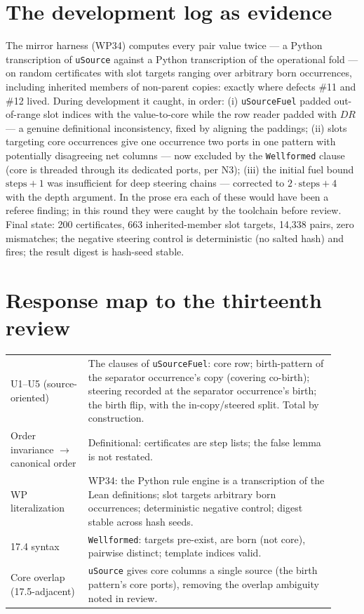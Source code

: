 \documentclass[11pt]{article}
\newcommand{\code}[1]{\texttt{#1}}
\begin{document}
\section{The development log as evidence}

The mirror harness (WP34) computes every pair value twice --- a Python
transcription of \code{uSource} against a Python transcription of the
operational fold --- on random certificates with slot targets ranging
over arbitrary born occurrences, including inherited members of
non-parent copies: exactly where defects \#11 and \#12 lived.  During
development it caught, in order: (i) \code{uSourceFuel} padded
out-of-range slot indices with the value-to-core while the row reader
padded with $DR$ --- a genuine definitional inconsistency, fixed by
aligning the paddings; (ii) slots targeting core occurrences give one
occurrence two ports in one pattern with potentially disagreeing net
columns --- now excluded by the \code{Wellformed} clause (core is
threaded through its dedicated ports, per N3); (iii) the initial fuel
bound $\mathrm{steps}+1$ was insufficient for deep steering chains ---
corrected to $2\cdot\mathrm{steps}+4$ with the depth argument.  In the
prose era each of these would have been a referee finding; in this
round they were caught by the toolchain before review.  Final state:
200 certificates, 663 inherited-member slot targets, 14{,}338 pairs,
zero mismatches; the negative steering control is deterministic (no
salted hash) and fires; the result digest is hash-seed stable.

\section{Response map to the thirteenth review}

\begin{center}
\begin{tabular}{p{0.22\linewidth}p{0.70\linewidth}}
\toprule
U1--U5 (source-oriented) & The clauses of \code{uSourceFuel}: core
row; birth-pattern of the separator occurrence's copy (covering
co-birth); steering recorded at the separator occurrence's birth; the
birth flip, with the in-copy/steered split.  Total by construction.\\
Order invariance $\to$ canonical order & Definitional: certificates
are step lists; the false lemma is not restated.\\
WP literalization & WP34: the Python rule engine is a transcription of
the Lean definitions; slot targets arbitrary born occurrences;
deterministic negative control; digest stable across hash seeds.\\
17.4 syntax & \code{Wellformed}: targets pre-exist, are born (not
core), pairwise distinct; template indices valid.\\
Core overlap (17.5-adjacent) & \code{uSource} gives core columns a
single source (the birth pattern's core ports), removing the
overlap ambiguity noted in review.\\
\bottomrule
\end{tabular}
\end{center}
\end{document}
